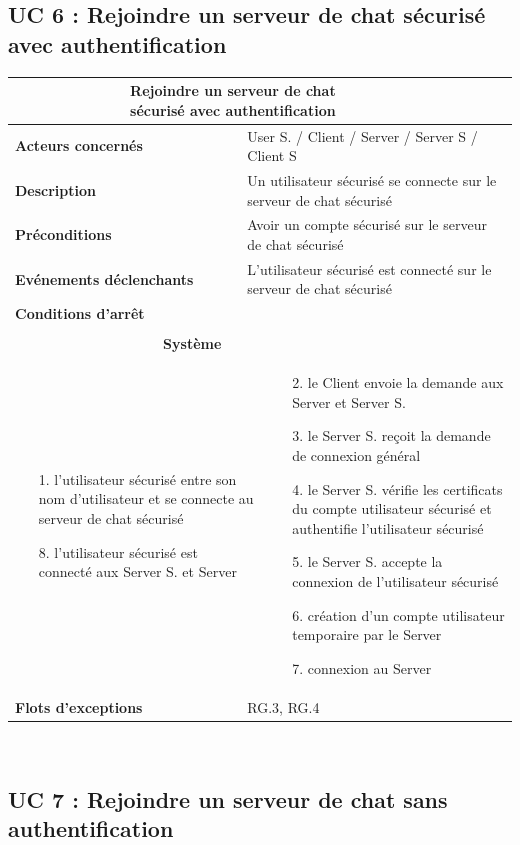 \documentclass[a4paper,11pt,french]{article}
\newcommand{\fiche}[9] {
	\noindent
\begin{tabular}{|p{3.5cm}| p{1cm} | p{3cm} | p{.5cm} | p{7cm}|} 
\hline
\rowcolor{blue}
\multicolumn{2}{|l|}{\color{white}\bfseries{Nom}} & \multicolumn{3}{l|}{\color{white}\bfseries{#1}}\\
\hline
\multicolumn{2}{|l|}{\bfseries{Acteurs concernés}} & \multicolumn{3}{m{10.5cm}|}{#2}\\
\hline
\multicolumn{2}{|l|}{\bfseries{Description}} & \multicolumn{3}{m{10.5cm}|}{#3}\\
\hline
\multicolumn{2}{|l|}{\bfseries{Préconditions}} & \multicolumn{3}{m{10.5cm}|}{#4}\\
\hline
\multicolumn{2}{|l|}{\bfseries{Evénements déclenchants}} & \multicolumn{3}{m{10.5cm}|}{#5}\\
\hline
\multicolumn{2}{|l|}{\bfseries{Conditions d'arrêt}} & \multicolumn{3}{m{10.5cm}|}{#6}\\
\hline
\rowcolor{gray}
\multicolumn{5}{|c|}{\bfseries{Description du flot d'événements principal}}\\
\hline
\rowcolor{gray}
\multicolumn{3}{|c|}{\bfseries{Acteur(s)}} & \multicolumn{2}{c|}{\bfseries{Système}}\\
\hline
\multicolumn{3}{|p{7.5cm}|}{#7} & \multicolumn{2}{p{7.5cm}|}{#8}\\
\hline
\multicolumn{2}{|l}{\bfseries{Flots d'exceptions}} & \multicolumn{3}{|p{11.5cm}|}{#9}\\
\hline
\end{tabular}
\\
}
\begin{document}
\subsection{UC 6 : Rejoindre un serveur de chat sécurisé avec authentification}

\fiche
	{Rejoindre un serveur de chat sécurisé avec authentification} %
	{User S. / Client / Server / Server S / Client S} %
	{Un utilisateur sécurisé se connecte sur le serveur de chat sécurisé} %
	{Avoir un compte sécurisé  sur le serveur de chat sécurisé} %
	{L’utilisateur sécurisé est connecté sur le serveur de chat sécurisé} %
	{} %
	{\begin{itemize}  %
		\item [1.] l’utilisateur sécurisé entre son nom d’utilisateur et se connecte au serveur de chat sécurisé
		\item [] 
		\item [] 
		\item [] 
		\item [] 
		\item [] 
		\item [] 
		\item [] 
		\item [] 
		\item []  
		\item [8.] l’utilisateur sécurisé est connecté aux Server S. et Server
	 \end{itemize}
	} 
	{\begin{itemize}  %
		\item []
		\item [2.] le Client envoie la demande aux Server et Server S.
		\item [3.] le Server S. reçoit la demande de connexion général
		\item [4.] le Server S. vérifie les certificats du compte utilisateur sécurisé et authentifie l’utilisateur sécurisé
		\item [5.] le Server S. accepte la connexion de l’utilisateur sécurisé
		\item [6.] création d’un compte utilisateur temporaire par le Server
		\item [7.] connexion au Server
	 \end{itemize}
	 }
	{RG.3, RG.4} %

\subsection{UC 7 : Rejoindre un serveur de chat sans authentification}
\end{document}
